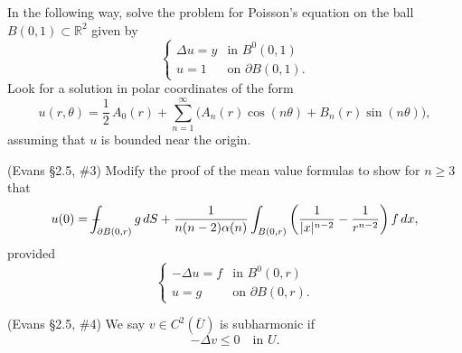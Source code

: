 \documentclass[12pt,fleqn]{exam}
\newcommand{\R}{\ensuremath{\mathbb{R}}}
\def\Xint#1{\mathchoice
	{\XXint\displaystyle\textstyle{#1}}%
	{\XXint\textstyle\scriptstyle{#1}}%
	{\XXint\scriptstyle\scriptscriptstyle{#1}}%
	{\XXint\scriptscriptstyle\scriptscriptstyle{#1}}%
\!\int}
\def\XXint#1#2#3{{\setbox0=\hbox{$#1{#2#3}{\int}$}
	\vcenter{\hbox{$#2#3$}}\kern-.5\wd0}}
\def\dashint{\Xint-}
\begin{document}
\begin{questions}

\question In the following way, solve the problem for Poisson's equation on the ball $B(0,1) \subset \R^2$ given by
\[\begin{cases}
\Delta u = y & \text{in } B^0(0,1) \\
u = 1 & \text{on } \partial B(0,1).
\end{cases}\]
Look for a solution in polar coordinates of the form
\[u(r,\theta) = \frac12\,A_0(r) + \sum_{n = 1}^{\infty} \big( A_n(r)\cos(n\theta) + B_n(r)\sin(n\theta) \big),\]
assuming that $u$ is bounded near the origin.


\question (Evans \S2.5, \#3) Modify the proof of the mean value formulas to show for $n \geq 3$ that
\[u(0) = \dashint_{\partial B(0,r)} g\,dS + \frac{1}{n(n-2)\alpha(n)} \int_{B(0,r)} \bigg(\frac{1}{|x|^{n-2}} - \frac{1}{r^{n-2}}\bigg)\,f\,dx ,\]
provided
\[\begin{cases}
-\Delta u = f & \text{in } B^0(0,r) \\
u = g & \text{on } \partial B(0,r) .
\end{cases}\]

\question (Evans \S2.5, \#4) We say $v \in C^2(\bar{U})$ is subharmonic if
\[-\Delta v \leq 0 \quad\text{in } U.\]

\end{questions}
\end{document}
